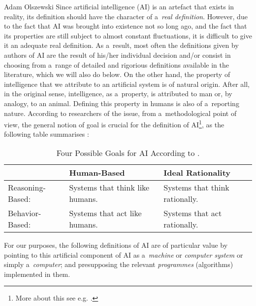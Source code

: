 \begin{artengenv}{Adam Olszewski}
Since artificial intelligence (AI) is an artefact that exists in reality, its definition should have the character of a~\textit{real definition}. However, due to the fact that AI was brought into existence not so long ago, and the fact that its properties are still subject to almost constant fluctuations, it is difficult to give it an adequate real definition. As a~result, most often the definitions given by authors of AI are the result of his/her individual decision and/or consist in choosing from a~range of detailed and rigorious definitions available in the literature, which we will also do below. On the other hand, the property of intelligence that we attribute to an artificial system is of natural origin. After all, in the original sense, intelligence, as a~property, is attributed to man or, by analogy, to an animal. Defining this property in humans is also of a~reporting nature. According to researchers of the issue, from a~methodological point of view, the general notion of goal is crucial for the definition of AI\footnote{More about this see e.g.
\parencite[][]{dodig-crnkovic_search_2022}.%
}, as the following table summarises 
\parencites[][]{bringsjord_artificial_2022}[cf.][]{russell_artificial_2021}:%






\begin{table}[H]
\begin{small}


\begin{tabularx}{\textwidth}{| m{} | X | X |}
\hline
&
Human-Based &
Ideal Rationality\\\hline
Reasoning-Based: &
Systems that think like humans. &
Systems that think rationally.\\\hline
Behavior-Based: &
Systems that act like humans. &
Systems that act rationally.\\\hline
\end{tabularx}
\end{small}
\caption{Four Possible Goals for AI According to
\parencite[][]{russell_artificial_2021}.%
}
\end{table}

For our purposes, the following definitions of AI are of particular value by pointing to this artificial component of AI as a~\textit{machine} or \textit{computer system} or simply a~\textit{computer}; and presupposing the relevant \textit{programmes} (algorithms) implemented in them.


\end{artengenv}
